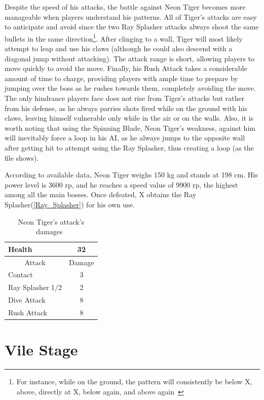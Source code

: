 Despite the speed of his attacks, the battle against Neon Tiger becomes more manageable when players understand his patterns. All of Tiger's attacks are easy to anticipate and avoid since the two Ray Splasher attacks always shoot the same bullets in the same direction\footnote{For instance, while on the ground, the pattern will consistently be below X, above, directly at X, below again, and above again~\cite{stratwiki:Safari}}. After clinging to a wall, Tiger will most likely attempt to leap and use his claws (although he could also descend with a diagonal jump without attacking). The attack range is short, allowing players to move quickly to avoid the move. Finally, his Rush Attack takes a considerable amount of time to charge, providing players with ample time to prepare by jumping over the boss as he rushes towards them, completely avoiding the move. The only hindrance players face does not rise from Tiger's attacks but rather from his defense, as he always parries shots fired while on the ground with his claws, leaving himself vulnerable only while in the air or on the walls. Also, it is worth noting that using the Spinning Blade, Neon Tiger's weakness, against him will inevitably force a loop in his AI, as he always jumps to the opposite wall after getting hit to attempt using the Ray Splasher, thus creating a loop (as the file  shows).

According to available data, Neon Tiger weighs 150 kg and stands at 198 cm. His power level is 3600 rp, and he reaches a speed value of 9900 rp, the highest among all the main bosses. Once defeated, X obtains the Ray Splasher(\ref{Ray_Splasher}) for his own use.

\begin{table}[htp]
	\centering
	\begin{tabular}[h]{l c}
		\toprule
		Health  & 32\\
		\midrule
		\multicolumn{1}{c}{Attack} & \multicolumn{1}{c}{Damage}\\
		Contact & 3\\
		Ray Splasher 1/2& 2\\
		Dive Attack& 8\\
		Rush Attack& 8\\
		\bottomrule
	\end{tabular}
	\caption{Neon Tiger's attack's damages~\cite{wiki:Neon_tiger,book:Compendium}}
\end{table} 


\section{Vile Stage}\label{stage:Vile}

